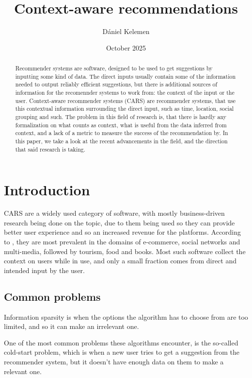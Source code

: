 \documentclass{article}
\title{Context-aware recommendations}
\author{Dániel Kelemen}
\date{October 2025}
\begin{document}
\maketitle

\begin{abstract}
    Recommender systems are software, designed to be used to get suggestions by inputting some kind of data. The direct inputs usually contain some of the information needed to output reliably efficient suggestions, but there is additional sources of information for the recomennder systems to work from: the context of the input or the user. Context-aware recommender systems (CARS) are recommender systems, that use this contextual information surrounding the direct input, such as time, location, social grouping and such. The problem in this field of research is, that there is hardly any formalization on what counts as context, what is useful from the data inferred from context, and a lack of a metric to measure the success of the recommendation by. In this paper, we take a look at the recent advancements in the field, and the direction that said research is taking.
\end{abstract}

\section{Introduction}
    CARS are a widely used category of software, with mostly business-driven research being done on the topic, due to them being used so they can provide better user experience and so an increased revenue for the platforms. According to \cite{mateos2024systematic}, they are most prevalent in the domains of e-commerce, social networks and multi-media, followed by tourism, food and books. Most such software collect the context on users while in use, and only a small fraction comes from direct and intended input by the user.
\subsection{Common problems}
    Information sparsity is when the options the algorithm has to choose from are too limited, and so it can make an irrelevant one.
    \par One of the most common problems these algorithms encounter, is the so-called cold-start problem, which is when a new user tries to get a suggestion from the recommender system, but it doesn't have enough data on them to make a relevant one.
\end{document}
